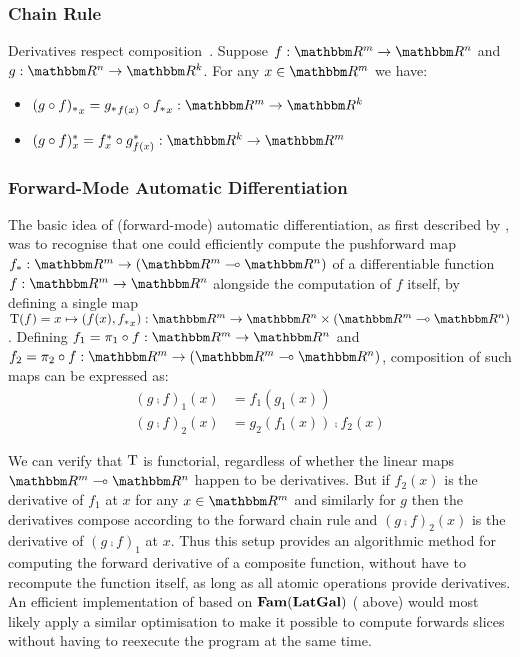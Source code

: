 \subsubsection{Chain Rule}

Derivatives respect composition~\cite{spivak65}. Suppose $f: \RR^m \to \RR^n$ and $g: \RR^n \to \RR^k$. For
any $x \in \RR^m$ we have:

\begin{itemize}
\item $\pushf{(g \comp f)}_x = \pushf{g}_{f(x)} \comp \pushf{f}_x: \RR^m \to \RR^k$
\item $\pullf{(g \comp f)}_x = \pullf{f}_{x} \comp \pullf{g}_{f(x)}: \RR^k \to \RR^m$
\end{itemize}

\subsubsection{Forward-Mode Automatic Differentiation}

The basic idea of (forward-mode) automatic differentiation, as first described by \citet{linnainmaa76}, was to
recognise that one could efficiently compute the pushforward map $\pushf{f}: \RR^m \to (\RR^m \linearto
\RR^n)$ of a differentiable function $f: \RR^m \to \RR^n$ alongside the computation of $f$ itself, by defining
a single map $\tangents(f) = x \mapsto (f(x), \pushf{f}_x): \RR^m \to \RR^n \times (\RR^m \linearto \RR^n)$.
Defining $f_1 = \pi_1 \comp f: \RR^m \to \RR^n$ and $f_2 = \pi_2 \comp f: \RR^m \to (\RR^m \linearto \RR^n)$,
composition of such maps can be expressed as:
\begin{align*}
(g \comp f)_1(x) &= f_1(g_1(x)) \\
(g \comp f)_2(x) &= g_2(f_1(x)) \comp f_2(x)
\end{align*}

We can verify that $\mathrm{T}$ is functorial, regardless of whether the linear maps $\RR^m \linearto \RR^n$
happen to be derivatives. But if $f_2(x)$ is the derivative of $f_1$ at $x$ for any $x \in \RR^m$ and
similarly for $g$ then the derivatives compose according to the forward chain rule and $(g \comp f)_2(x)$ is
the derivative of $(g \comp f)_1$ at $x$. Thus this setup provides an algorithmic method for computing the
forward derivative of a composite function, without have to recompute the function itself, as long as all
atomic operations provide derivatives. An efficient implementation of \GPS based on $\mathbf{Fam}(\mathbf{LatGal})$
( above) would most likely apply a similar optimisation to make it possible to
compute forwards slices without having to reexecute the program at the same time.

